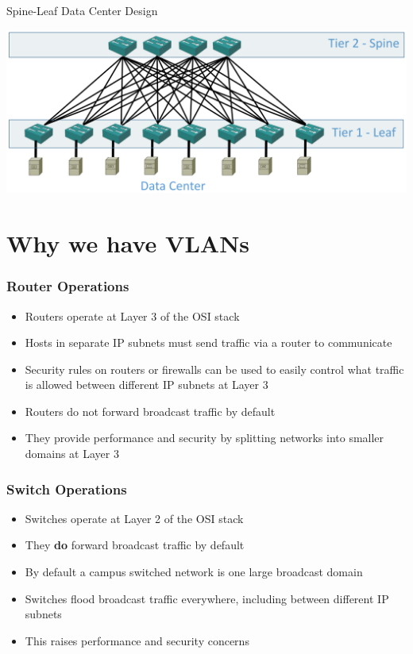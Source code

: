\documentclass[pdflatex,compress,mathserif]{beamer}
\begin{document}
\begin{frame}{Spine-Leaf Data Center Design}
	\begin{center}
		\includegraphics[width=\linewidth]{img/img08}
	\end{center}
\end{frame}

\section{Why we have VLANs}

\begin{frame}
	\frametitle{Router Operations}
	\begin{itemize}
		\item Routers operate at Layer 3 of the OSI stack
		\item Hosts in separate IP subnets must send traffic via a router to
communicate
		\item Security rules on routers or firewalls can be used to easily control what
traffic is allowed between different IP subnets at Layer 3
		\item Routers do not forward broadcast traffic by default
		\item They provide performance and security by splitting networks into
smaller domains at Layer 3
	\end{itemize}
\end{frame}

\begin{frame}
	\frametitle{Switch Operations}
	\begin{itemize}
		\item Switches operate at Layer 2 of the OSI stack
		\item They \textbf{do} forward broadcast traffic by default
		\item By default a campus switched network is one large broadcast domain
		\item Switches flood broadcast traffic everywhere, including between
different IP subnets
		\item This raises performance and security concerns
	\end{itemize}
\end{frame}
\end{document}
